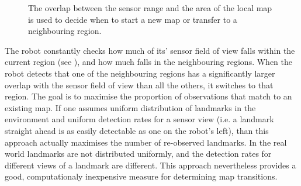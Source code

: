 \begin{figure}
\begin{center}
\quad \quad \quad
{}\quad
{}
\end{center}
\caption[Map regions used for triggering transition events]
{The overlap between the sensor range and the area of the local 
 map is used to decide when to start a new map or transfer to a 
 neighbouring region.}
\label{fig:StartNew}
\end{figure}

The robot constantly checks how much of its' sensor field of view
falls within the current region (see ), and
how much falls in the neighbouring regions. When the robot detects
that one of the neighbouring regions has a significantly larger
overlap with the sensor field of view than all the others, it switches
to that region. The goal is to maximise the proportion of observations
that match to an existing map. If one assumes uniform distribution of
landmarks in the environment and uniform detection rates for a sensor
view (i.e. a landmark straight ahead is as easily detectable as one on
the robot's left), than this approach actually maximises the number of
re-observed landmarks. In the real world landmarks are not distributed
uniformly, and the detection rates for different views of a landmark
are different. This approach nevertheless provides a good,
computationaly inexpensive measure for determining map transitions.

